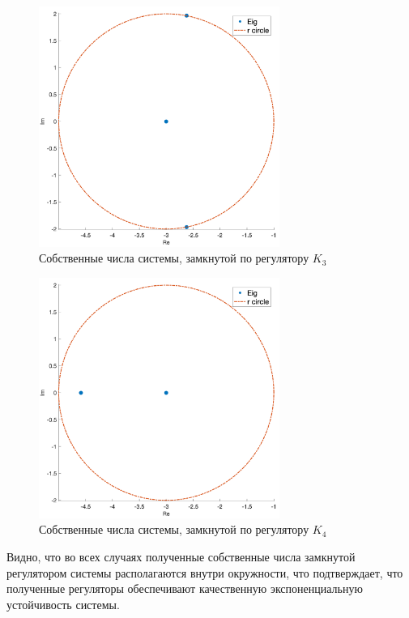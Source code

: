 \begin{figure}[ht!]
    \centering
    \includegraphics[width=0.7\textwidth]{media/plots/task3_eigs_3.png}
    \caption{Собственные числа системы, замкнутой по регулятору $K_3$}
    \label{fig:task3_eigs3}
\end{figure}
\begin{figure}[ht!]
    \centering
    \includegraphics[width=0.7\textwidth]{media/plots/task3_eigs_4.png}
    \caption{Собственные числа системы, замкнутой по регулятору $K_4$}
    \label{fig:task3_eigs4}
\end{figure}

Видно, что во всех случаях полученные собственные числа замкнутой регулятором 
системы располагаются внутри окружности, что подтверждает, что полученные регуляторы 
обеспечивают качественную экспоненциальную устойчивость системы. 

